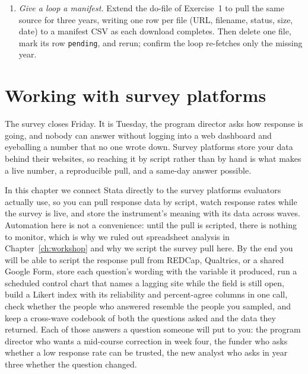 \documentclass[
    a4paper,
    fontsize=10pt,
    twoside=true,
    numbers=noenddot,
]{kaobook}
\begin{document}
\begin{enumerate}
    \texttt{combineall using "built/cars\_panel", cmethod(append)
    directory("raw/") map("map.csv")}, then \texttt{use} the result
    and confirm from the harmonization table and
    \texttt{char list price[source]} that the two years stacked into
    a single \texttt{price} column that records its 2020 provenance.
  \item \emph{Give a loop a manifest.} Extend the do-file of
    Exercise~1 to pull the same source for three years, writing one
    row per file (URL, filename, status, size, date) to a manifest
    CSV as each download completes. Then delete one file, mark its
    row \texttt{pending}, and rerun; confirm the loop re-fetches
    only the missing year.
\end{enumerate}

\chapter{Working with survey platforms}\label{ch:surveys}

The survey closes Friday. It is Tuesday, the program director asks how response is going, and nobody can answer without logging into a web dashboard and eyeballing a number that no one wrote down. Survey platforms store your data behind their websites, so reaching it by script rather than by hand is what makes a live number, a reproducible pull, and a same-day answer possible.

In this chapter we connect Stata directly to the survey platforms evaluators actually use, so you can pull response data by script, watch response rates while the survey is live, and store the instrument's meaning with its data across waves. Automation here is not a convenience: until the pull is scripted, there is nothing to monitor, which is why we ruled out spreadsheet analysis in Chapter~\ref{ch:workshop} and why we script the survey pull here. By the end you will be able to script the response pull from REDCap, Qualtrics, or a shared Google Form, store each question's wording with the variable it produced, run a scheduled control chart that names a lagging site while the field is still open, build a Likert index with its reliability and percent-agree columns in one call, check whether the people who answered resemble the people you sampled, and keep a cross-wave codebook of both the questions asked and the data they returned. Each of those answers a question someone will put to you: the program director who wants a mid-course correction in week four, the funder who asks whether a low response rate can be trusted, the new analyst who asks in year three whether the question changed.
\end{document}
